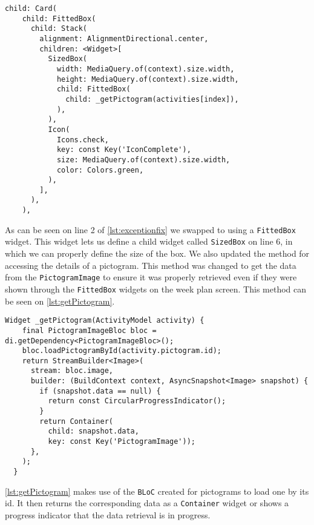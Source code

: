 \begin{lstlisting}[caption={An excerpt showing the use of FittedBox instead of PictogramImage},label={lst:exceptionfix}]
  child: Card( 
    child: FittedBox(
      child: Stack(
        alignment: AlignmentDirectional.center,
        children: <Widget>[
          SizedBox(
            width: MediaQuery.of(context).size.width,
            height: MediaQuery.of(context).size.width,
            child: FittedBox(
              child: _getPictogram(activities[index]),
            ),
          ),
          Icon(
            Icons.check,
            key: const Key('IconComplete'),
            size: MediaQuery.of(context).size.width,
            color: Colors.green,
          ),
        ],
      ),
    ),
\end{lstlisting}
As can be seen on line 2 of \autoref{lst:exceptionfix} we swapped to using a \texttt{FittedBox} widget. This widget lets us define a child widget called \texttt{SizedBox} on line 6, in which we can properly define the size of the box.
We also updated the method for accessing the details of a pictogram.
This method was changed to get the data from the \texttt{PictogramImage} to ensure it was properly retrieved even if they were shown through the \texttt{FittedBox} widgets on the week plan screen.
This method can be seen on \autoref{lst:getPictogram}.
\begin{lstlisting}[caption={The getPictogram method to retrieve the details of a pictogram},label={lst:getPictogram}] 
  Widget _getPictogram(ActivityModel activity) {
    final PictogramImageBloc bloc = di.getDependency<PictogramImageBloc>();
    bloc.loadPictogramById(activity.pictogram.id);
    return StreamBuilder<Image>(
      stream: bloc.image,
      builder: (BuildContext context, AsyncSnapshot<Image> snapshot) {
        if (snapshot.data == null) {
          return const CircularProgressIndicator();
        }
        return Container(
          child: snapshot.data, 
          key: const Key('PictogramImage'));
      },
    );
  }
\end{lstlisting}
\autoref{lst:getPictogram} makes use of the \texttt{BLoC} created for pictograms to load one by its id.
It then returns the corresponding data as a \texttt{Container} widget or shows a progress indicator that the data retrieval is in progress.